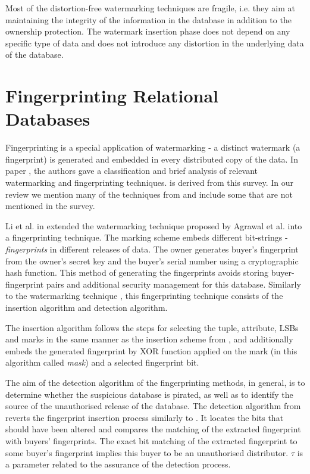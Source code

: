 Most of the distortion-free watermarking techniques are fragile, i.e. they aim at maintaining the integrity of the information in the database in addition to the ownership protection. 
The watermark insertion phase does not depend on any specific type of data and does not introduce any distortion in the underlying data of the database.

\section{Fingerprinting Relational Databases}

Fingerprinting is a special application of watermarking - a distinct watermark (a fingerprint) is generated and embedded in every distributed copy of the data. 
In paper \cite{kamran2018comprehensive}, the authors gave a classification and brief analysis of relevant watermarking and fingerprinting techniques.  is derived from this survey. 
In our review we mention many of the techniques from \cite{kamran2018comprehensive} and include some that are not mentioned in the survey.

Li et al. in \cite{li2005fingerprinting} extended the watermarking technique proposed by Agrawal et al. \cite{agrawal2003watermarking} into a fingerprinting technique.
The marking scheme embeds different bit-strings - \textit{fingerprints} in different releases of data.
The owner generates buyer’s fingerprint from the owner’s secret key and the buyer’s serial number using a cryptographic hash function.
This method of generating the fingerprints avoids storing buyer-fingerprint pairs and additional security management for this database.
Similarly to the watermarking technique \cite{agrawal2003watermarking}, this fingerprinting technique consists of the insertion algorithm and detection algorithm. 

The insertion algorithm follows the steps for selecting the tuple, attribute, LSBs and marks in the same manner as the insertion scheme from \cite{agrawal2003watermarking}, and additionally embeds the generated fingerprint by XOR function applied on the mark (in this algorithm called \textit{mask}) and a selected fingerprint bit. 

The aim of the detection algorithm of the fingerprinting methods, in general, is to determine whether the suspicious database is pirated, as well as to identify the source of the unauthorised release of the database. 
The detection algorithm from \cite{li2005fingerprinting} reverts the fingerprint insertion process similarly to \cite{agrawal2003watermarking}. It locates the bits that should have been altered and compares the matching of the extracted fingerprint with buyers’ fingerprints. 
The exact bit matching of the extracted fingerprint to some buyer’s fingerprint implies this buyer to be an unauthorised distributor.
$\tau$ is a parameter related to the assurance of the detection process.
